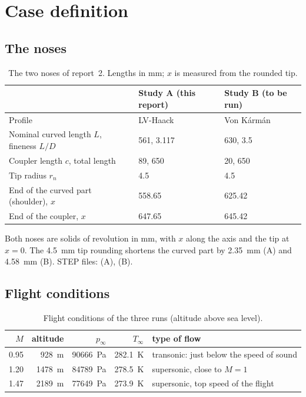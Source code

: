 \section{Case definition}
\label{sec:case}

\subsection{The noses}

\begin{table}[H]
\centering
\caption{The two noses of report~2. Lengths in mm; $x$ is measured from the rounded tip.}
\label{tab:noses}
\small
\begin{tabular}{@{}lll@{}}
\toprule
 & Study A (this report) & Study B (to be run) \\
\midrule
Profile & LV-Haack & Von K\'arm\'an \\
Nominal curved length $L$, fineness $L/D$ & 561, 3.117 & 630, 3.5 \\
Coupler length $c$, total length & 89, 650 & 20, 650 \\
Tip radius $r_n$ & 4.5 & 4.5 \\
End of the curved part (shoulder), $x$ & 558.65 & 625.42 \\
End of the coupler, $x$ & 647.65 & 645.42 \\
\bottomrule
\end{tabular}
\end{table}

\noindent Both noses are solids of revolution in mm, with $x$ along the axis and the tip at $x = 0$. The
\SI{4.5}{mm} tip rounding shortens the curved part by \SI{2.35}{mm} (A) and \SI{4.58}{mm} (B). STEP files:
 (A),
 (B).

\subsection{Flight conditions}

\begin{table}[H]
\centering
\caption{Flight conditions of the three runs (altitude above sea level).}
\label{tab:points}
\small
\begin{tabular}{@{}rrrrl@{}}
\toprule
$M$ & altitude & $p_\infty$ & $T_\infty$ & type of flow \\
\midrule
0.95 & \SI{928}{m}  & \SI{90666}{Pa} & \SI{282.1}{K} & transonic: just below the speed of sound \\
1.20 & \SI{1478}{m} & \SI{84789}{Pa} & \SI{278.5}{K} & supersonic, close to $M = 1$ \\
1.47 & \SI{2189}{m} & \SI{77649}{Pa} & \SI{273.9}{K} & supersonic, top speed of the flight \\
\bottomrule
\end{tabular}
\end{table}

